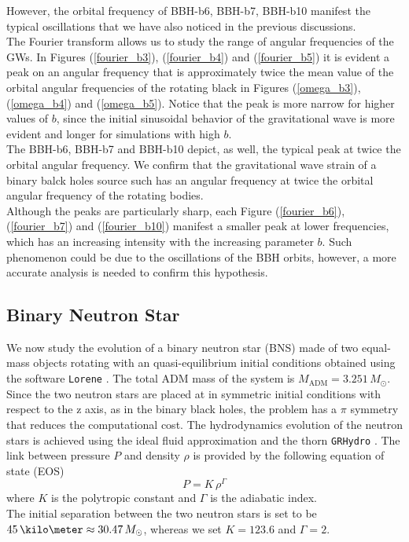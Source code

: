 However, the orbital frequency of BBH-b6, BBH-b7, BBH-b10 manifest the typical oscillations that we have also noticed in the previous discussions.\\
The Fourier transform allows us to study the range of angular frequencies of the GWs.
In Figures (\ref{fourier_b3}), (\ref{fourier_b4}) and (\ref{fourier_b5}) it is evident a peak on an angular frequency that is approximately twice the mean value of the orbital angular frequencies of the rotating black in Figures (\ref{omega_b3}), (\ref{omega_b4}) and (\ref{omega_b5}).
Notice that the peak is more narrow for higher values of $b$, since the initial sinusoidal behavior of the gravitational wave is more evident and longer for simulations with high $b$.\\
The BBH-b6, BBH-b7 and BBH-b10 depict, as well, the typical peak at twice the orbital angular frequency.
We confirm that the gravitational wave strain of a binary balck holes source such has an angular frequency at twice the orbital angular frequency of the rotating bodies.\\
Although the peaks are particularly sharp,  each Figure (\ref{fourier_b6}), (\ref{fourier_b7}) and (\ref{fourier_b10}) manifest a smaller peak at lower frequencies, which has an increasing intensity with the increasing parameter $b$.
Such phenomenon could be due to the oscillations of the BBH orbits, however, a more accurate analysis is needed to confirm this hypothesis.\\

\pagebreak

\subsection{Binary Neutron Star}
We now study the evolution of a binary neutron star (BNS) made of two equal-mass objects rotating with an quasi-equilibrium initial conditions obtained using the software \texttt{Lorene} \cite{Lorene:web}.
The total ADM mass of the system is $M_{\text{ADM}} = 3.251 \, M_{\odot}$.
Since the two neutron stars are placed at in symmetric initial conditions with respect to the z axis, as in the binary black holes, the problem has a $\pi$ symmetry that reduces the computational cost.
The hydrodynamics evolution of the neutron stars is achieved using the ideal fluid approximation and the thorn \texttt{GRHydro} \cite{moesta_grhydro:_2014}. 
The link between pressure $P$ and density $\rho$ is provided by the following equation of state (EOS)
\[
P = K \, \rho ^{\Gamma}
\]
where $K$ is the polytropic constant and $\Gamma$ is the adiabatic index.\\
The initial separation between the two neutron stars is set to be $45 \, \kilo \meter \approx 30.47 \, M_{\odot}$, whereas we set $K=123.6$ and $\Gamma=2$.\\

